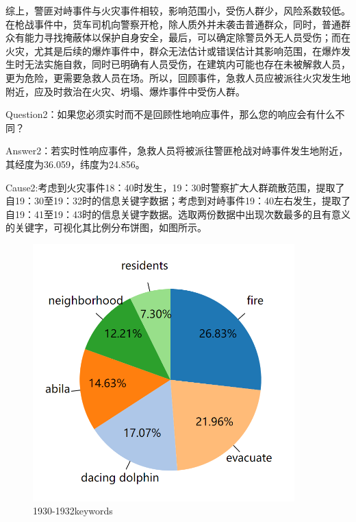 \documentclass[a4paper]{article}
\begin{document}
综上，警匪对峙事件与火灾事件相较，影响范围小，受伤人群少，风险系数较低。在枪战事件中，货车司机向警察开枪，除人质外并未袭击普通群众，同时，普通群众有能力寻找掩蔽体以保护自身安全，最后，可以确定除警员外无人员受伤；而在火灾，尤其是后续的爆炸事件中，群众无法估计或错误估计其影响范围，在爆炸发生时无法实施自救，同时已明确有人员受伤，在建筑内可能也存在未被解救人员，更为危险，更需要急救人员在场。所以，回顾事件，急救人员应被派往火灾发生地附近，应及时救治在火灾、坍塌、爆炸事件中受伤人群。

Question2：如果您必须实时而不是回顾性地响应事件，那么您的响应会有什么不同？

Answer2：若实时性响应事件，急救人员将被派往警匪枪战对峙事件发生地附近，其经度为36.059，纬度为24.856。

Cause2:考虑到火灾事件18：40时发生，19：30时警察扩大人群疏散范围，提取了自19：30至19：32时的信息关键字数据；考虑到对峙事件19：40左右发生，提取了自19：41至19：43时的信息关键字数据。选取两份数据中出现次数最多的且有意义的关键字，可视化其比例分布饼图，如图所示。

\begin{figure}[H]
    \centering
    \includegraphics[width=0.9\textwidth]{images/3-6.png}
    \caption{1930-1932keywords}\label{fig:3-6}
    \vspace{\baselineskip}
\end{figure}
\end{document}

